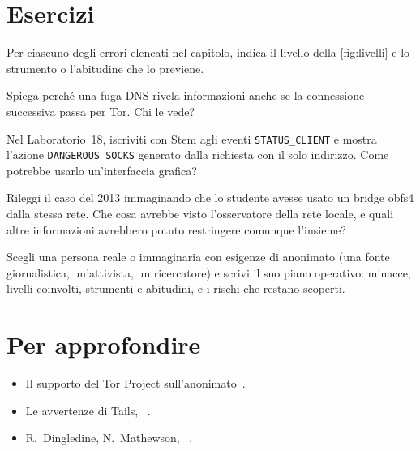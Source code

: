 \section*{Esercizi}

\begin{esercizio}[1]\label{es:28-livello}
Per ciascuno degli errori elencati nel capitolo, indica il livello della \cref{fig:livelli} e lo strumento o l'abitudine che lo previene.
\end{esercizio}

\begin{esercizio}[1]\label{es:28-dns}
Spiega perché una fuga DNS rivela informazioni anche se la connessione successiva passa per Tor. Chi le vede?
\end{esercizio}

\begin{esercizio}[2]\label{es:28-evento}
Nel Laboratorio~18, iscriviti con Stem agli eventi \texttt{STATUS\_CLIENT} e mostra l'azione \texttt{DANGEROUS\_SOCKS} generato dalla richiesta con il solo indirizzo. Come potrebbe usarlo un'interfaccia grafica?
\end{esercizio}

\begin{esercizio}[2]\label{es:28-insieme}
Rileggi il caso del 2013 immaginando che lo studente avesse usato un bridge obfs4 dalla stessa rete. Che cosa avrebbe visto l'osservatore della rete locale, e quali altre informazioni avrebbero potuto restringere comunque l'insieme?
\end{esercizio}

\begin{esercizio}[3]\label{es:28-modello}
Scegli una persona reale o immaginaria con esigenze di anonimato (una fonte giornalistica, un'attivista, un ricercatore) e scrivi il suo piano operativo: minacce, livelli coinvolti, strumenti e abitudini, e i rischi che restano scoperti.
\end{esercizio}

\section*{Per approfondire}
\begin{itemize}
  \item Il supporto del Tor Project sull'anonimato~\cite{torsafety}.
  \item Le avvertenze di Tails, ~\cite{tailswarnings}.
  \item R.~Dingledine, N.~Mathewson, ~\cite{dingledine2006company}.
\end{itemize}
